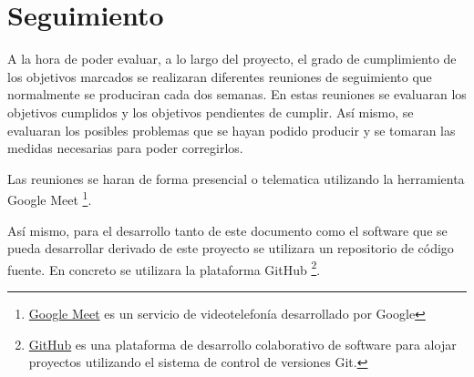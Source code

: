 \section{Seguimiento}
\label{sec:metodologia:seguimiento}

A la hora de poder evaluar, a lo largo del proyecto, el grado de cumplimiento de los objetivos
marcados se realizaran diferentes reuniones de seguimiento que normalmente se produciran cada 
dos semanas. En estas reuniones se evaluaran los objetivos cumplidos y los objetivos pendientes
de cumplir. Así mismo, se evaluaran los posibles problemas que se hayan podido producir y se
tomaran las medidas necesarias para poder corregirlos.

Las reuniones se haran de forma presencial o telematica utilizando la herramienta Google Meet
\footnote{\href{https://meet.google.com/}{Google Meet} es un servicio de videotelefonía desarrollado por Google}.

Así mismo, para el desarrollo tanto de este documento como el software que se pueda desarrollar derivado
de este proyecto se utilizara un repositorio de código fuente. En concreto se utilizara la plataforma
GitHub \footnote{\href{https://github.com/}{GitHub} es una plataforma de desarrollo colaborativo de software
para alojar proyectos utilizando el sistema de control de versiones Git.}.

